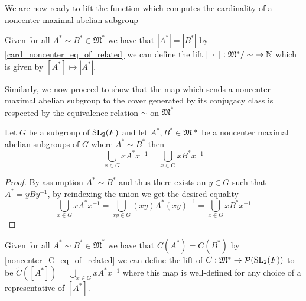 \begin{footnotesize}
We are now ready to lift the function which computes the cardinality of a noncenter maximal abelian subgroup

\begin{definition}
  \label{lift_card_noncenter}
  \leanok 
  Given for all $A^* \sim B^* \in \mathfrak{M}^*$ we have that $|A^*| = |B^*|$ by \ref{card_noncenter_eq_of_related} we can define the lift
  $|\; \cdot \;| : \mathfrak{M}^* / \sim \; \rightarrow \mathbb{N}$ which is given by $[A^*] \mapsto |A^*|$.
\end{definition}


Similarly, we now proceed to show that the map which sends a noncenter maximal abelian subgroup to the cover generated by its conjugacy class is respected by the equivalence relation $\sim$ on $\mathfrak{M}^*$

\begin{lemma}
  \label{noncenter_C_eq_of_related}
  \leanok
  Let $G$ be a subgroup of $\operatorname{SL}_2(F)$ and let $A^* , B^* \in \mathfrak{M}*$ be a noncenter maximal abelian subgroups of $G$ where $A^* \sim B^*$
  then 
  \[
  \bigcup_{x \in G} x A^* x^{-1} = \bigcup_{x \in G} x B^* x^{-1}
  \]
\end{lemma}
\begin{proof}
By assumption $A^* \sim B^*$ and thus there exists an $y \in G$ such that $A^* = yBy^{-1}$, by reindexing the union we get the desired equality
\[
  \bigcup_{x \in G} x A^* x^{-1} = \bigcup_{xy \in G} (xy) A^* (xy)^{-1}  = \bigcup_{x \in G} x B^* x^{-1}
  \]
\end{proof}


\begin{definition}
\label{lift_noncenter_C}
\leanok
 Given for all $A^* \sim B^* \in \mathfrak{M}^*$ we have that $C(A^*) = C(B^*)$ by \ref{noncenter_C_eq_of_related} we can define the lift of $C : \mathfrak{M}^* \rightarrow \mathcal{P}(\operatorname{SL}_2(F))$ to be 
  $\tilde{C}([A^*]) = \bigcup_{x \in G} x A^* x^{-1}$ where this map is well-defined for any choice of a representative of $[A^*]$.
\end{definition}



\end{footnotesize}
